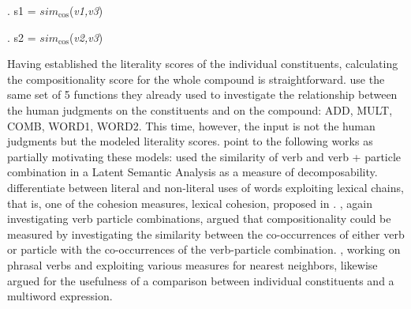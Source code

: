 \ex. \label{ex:reddy.lit.score.N1}
s1 = $sim_{\text{cos}}$(\emph{v1,v3})

\ex. \label{ex:reddy.lit.score.N2}
s2 = $sim_{\text{cos}}$(\emph{v2,v3})

Having established the literality scores of the individual
constituents, calculating the compositionality score for the whole
compound is straightforward.  \citet{Reddyetal:2011} use the same set
of 5 functions they already used to investigate the relationship
between the human judgments on the constituents and on the compound:
ADD, MULT, COMB, WORD1, WORD2. This time, however, the input is not
the human judgments but the modeled literality
scores. \citet{Reddyetal:2011} point to the following works as
partially motivating these models: \citet{Baldwinetal:2003} used the
similarity of verb and verb + particle combination in a Latent
Semantic Analysis as a measure of
decomposability. \citet{SporlederandLi:2009} differentiate between
literal and non-literal uses of words exploiting lexical chains, that
is, one of the cohesion measures, lexical cohesion, proposed in
\citet{HallidayandHasan:1976}. \citet{Bannardetal:2003}, again
investigating verb particle combinations, argued that
compositionality could be measured by investigating the similarity
between the co-occurrences of either verb or particle with the
co-occurrences of the verb-particle
combination. \citet{McCarthyetal:2003}, working on phrasal verbs and exploiting various measures
for nearest neighbors, likewise argued for the usefulness of a
comparison between individual constituents and a multiword
expression. %


